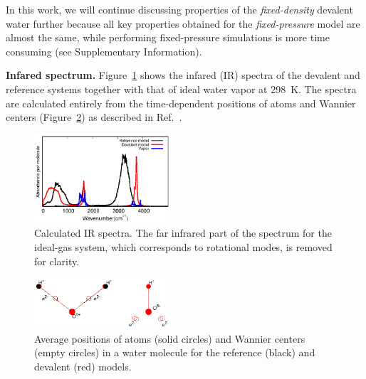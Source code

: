 \documentclass[10pt,amsmath,twocolumn,aps,prl,superscriptaddress,floatfix]{revtex4-1}
\begin{document}
In this work, we will continue discussing properties of the \emph{fixed-density} devalent water further because all key properties obtained for the \emph{fixed-pressure} model are almost the same, while performing fixed-pressure simulations is more time consuming (see Supplementary Information).


\textbf{Infared spectrum.} Figure~\ref{Fig:IR} shows the infared (IR) spectra of the devalent and reference systems together with that of ideal water vapor at 298~K. The spectra are calculated entirely from the time-dependent positions of atoms and Wannier centers (Figure~\ref{Fig:acoord}) as described in Ref.~.

\begin{figure}[ht]
\centering
\includegraphics[width=0.45\textwidth]{new_ir}
\caption{Calculated IR spectra. The far infrared part of the spectrum for the ideal-gas system, which corresponds to rotational modes, is removed for clarity. 
} \label{Fig:IR}
\end{figure}

\begin{figure}
\includegraphics[width=0.45\textwidth]{acoord}
\caption{Average positions of atoms (solid circles) and Wannier centers (empty circles) in a water molecule for the reference (black) and devalent (red) models. 
} \label{Fig:acoord}
\end{figure}
\end{document}
